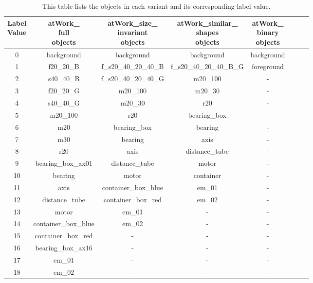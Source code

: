 \begin{itemize}
		\begin{table}[h]
			\centering
			\begin{tabular}{|c|c|c|c|c|c|c|c|}
			\hline 
  			\makecell{Label \\Value} & \makecell{atWork\_\\full \\ objects} & \makecell{atWork\_size\_\\invariant \\ objects} & \makecell{atWork\_similar\_\\shapes \\ objects} & \makecell{atWork\_\\binary \\ objects} \\ 
			\hline
			0 & background & background & background & background \\ 
			\hline
			1 & f20\_20\_B & f\_s20\_40\_20\_40\_B & f\_s20\_40\_20\_40\_B\_G & foreground \\ 
			\hline
			2 & s40\_40\_B & f\_s20\_40\_20\_40\_G & m20\_100 & - \\ 
			\hline
			3 & f20\_20\_G & m20\_100 & m20\_30 & - \\ 
			\hline
			4 & s40\_40\_G & m20\_30 & r20 & - \\ 
			\hline
			5 & m20\_100 & r20 & bearing\_box & - \\ 
			\hline
			6 & m20 & bearing\_box & bearing & - \\ 
			\hline
			7 & m30 & bearing & axis & - \\ 
			\hline
			8 & r20 & axis & distance\_tube & - \\ 
			\hline	
			9 & bearing\_box\_ax01 & distance\_tube & motor & - \\ 
			\hline		
			10 & bearing & motor & container & - \\ 
			\hline
			11 & axis & container\_box\_blue & em\_01 & - \\ 
			\hline
			12 & distance\_tube & container\_box\_red & em\_02 & - \\ 
			\hline
			13 & motor & em\_01 & - & - \\ 
			\hline
			14 & container\_box\_blue & em\_02 & - & - \\ 
			\hline
			15 & container\_box\_red & - & - & - \\ 
			\hline
			16 & bearing\_box\_ax16 & - & - & - \\ 
			\hline
			17 & em\_01 & - & - & - \\ 
			\hline
			18 & em\_02 & - & - & - \\ 
			\hline
			\end{tabular}
			\caption{This table lists the objects in each variant and its corresponding label value.} 
			\label{Table:variants}
		\end{table}
		
	\end{itemize}

